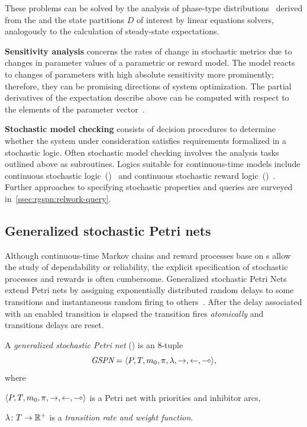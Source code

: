 These problems can be solved by the analysis of phase-type distributions~\citep{Neuts75phasetype} derived from the  and the state partitions \(D\) of interest by linear equations solvers, analogously to the calculation of steady-state expectations.

\newpara \textbf{Sensitivity analysis} concerns the rates of change in stochastic metrics due to changes in parameter values of a parametric  or reward model. The model reacts to changes of parameters with high absolute sensitivity  more prominently; therefore, they can be promising directions of system optimization. The partial derivatives of the expectation describe above can be computed with respect to the elements of the parameter vector~\citep{Blake88sensitivity,Ramesh93sensitivity}.

\newpara \textbf{Stochastic model checking} consists of decision procedures to determine whether the system under consideration satisfies requirements formalized in a stochastic logic. Often stochastic model checking involves the analysis tasks outlined above as subroutines. Logics suitable for continuous-time models include continuous stochastic logic~()~\citep{Aziz96csl} and continuous stochastic reward logic~()~\citep{Kwiatkowska06csrl}. Further approaches to specifying stochastic properties and queries are surveyed in~\vref{ssec:rgspn:relwork-query}.

\subsection{Generalized stochastic Petri nets}
\label{ssec:background:gspn}

Although continuous-time Markov chains and reward processes base on s allow the study of dependability or reliability, the explicit specification of stochastic processes and rewards is often cumbersome. Generalized stochastic Petri Nets extend Petri nets by assigning exponentially distributed random delays to some transitions and instantaneous random firing to others~\citep{Marsan84gspn}. After the delay associated with an enabled transition is elapsed the transition fires \emph{atomically} and transitions delays are reset.

\begin{dfn}
  A \emph{generalized stochastic Petri net} () is an 8-tuple
  \begin{equation}
    \textit{GSPN} = \langle P, T, m_0, \pi, \lambda, {\rightarrow}, {\leftarrow}, {\multimap} \rangle \text,
  \end{equation}
  where
  \begin{compactitem}
  \item \(\langle P, T, m_0, \pi, {\rightarrow}, {\leftarrow}, {\multimap} \rangle\) is a Petri net with priorities and inhibitor arcs,
  \item \(\lambda\colon T \to \mathbb{R}^{+}\) is a \emph{transition rate and weight function}.
  \end{compactitem}
\end{dfn}

